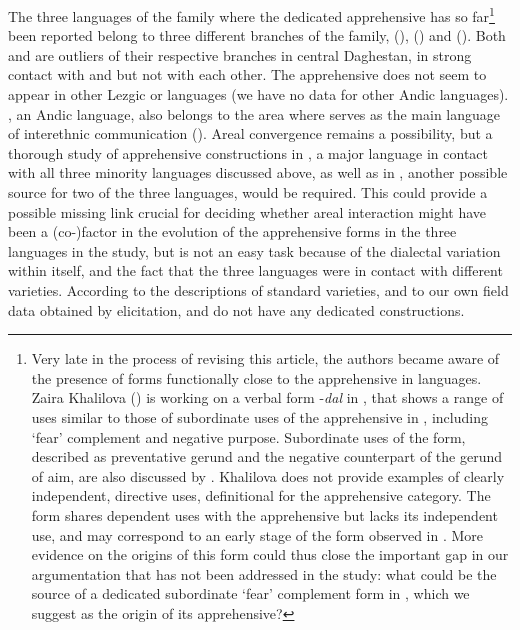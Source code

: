 \documentclass[output=paper,colorlinks,citecolor=brown]{langscibook}
\begin{document}
The three languages of the family where the dedicated apprehensive has so far\footnote{Very late in the process of revising this article, the authors became aware of the presence of forms functionally close to the apprehensive in  languages. Zaira Khalilova (\citealt{khalilova}) is working on a verbal form \nobreakdash-\textit{dal} in , that shows a range of uses similar to those of subordinate uses of the apprehensive in , including `fear' complement and negative purpose. Subordinate uses of the  form, described as preventative gerund and the negative counterpart of the gerund of aim, are also discussed by \citet[267]{KibrikTestelec2004}. Khalilova does not provide examples of clearly independent, directive uses, definitional for the apprehensive category. The  form  shares dependent uses with the  apprehensive but lacks its independent use, and may correspond to an early stage of the form observed in . More evidence on the origins of this form could thus close the important gap in our argumentation that has not been addressed in the study: what could be the source of a dedicated subordinate `fear' complement form in , which we suggest as the origin of its apprehensive?} been reported belong to three different branches of the family,  (),  () and  (). Both  and  are outliers of their respective branches in central Daghestan, in strong contact with  and  but not with each other. The apprehensive does not seem to appear in other Lezgic or  languages (we have no data for other Andic languages). , an Andic language, also belongs to the area where  serves as the main language of interethnic communication (\citealt{DobrushinaZakirova2019}). Areal convergence remains a possibility, but a thorough study of apprehensive constructions in , a major language in contact with all three minority languages discussed above, as well as in , another possible source for two of the three languages, would be required. This could provide a possible missing link crucial for deciding whether areal interaction might have been a (co-)factor in the evolution of the apprehensive forms in the three languages in the study, but is not an easy task because of the dialectal variation within  itself, and the fact that the three languages were in contact with different  varieties. According to the descriptions of standard varieties, and to our own field data obtained by elicitation,  and  do not have any dedicated constructions. 
\end{document}

